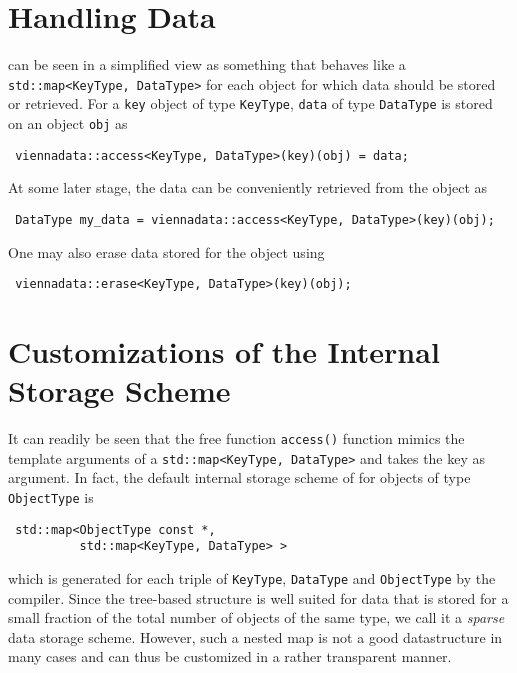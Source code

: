 \section{Handling Data}
{\ViennaData} can be seen in a simplified view as something that behaves like a \lstinline|std::map<KeyType, DataType>| for each object for which data should be stored or retrieved. For a \lstinline|key| object of type \lstinline|KeyType|, \lstinline|data| of type \lstinline|DataType| is stored on an object \lstinline|obj| as
\begin{lstlisting}
 viennadata::access<KeyType, DataType>(key)(obj) = data;
\end{lstlisting}
At some later stage, the data can be conveniently retrieved from the object as
\begin{lstlisting}
 DataType my_data = viennadata::access<KeyType, DataType>(key)(obj);
\end{lstlisting}
One may also erase data stored for the object using
\begin{lstlisting}
 viennadata::erase<KeyType, DataType>(key)(obj);
\end{lstlisting}

\section{Customizations of the Internal Storage Scheme}
It can readily be seen that the free function \lstinline|access()| function mimics the template arguments of a \lstinline|std::map<KeyType, DataType>| and takes the key as argument. In fact, the default internal storage scheme of {\ViennaData} for objects of type \lstinline|ObjectType| is 
\begin{lstlisting}
 std::map<ObjectType const *,
          std::map<KeyType, DataType> >
\end{lstlisting}
which is generated for each triple of \lstinline|KeyType|, \lstinline|DataType| and \lstinline|ObjectType| by the compiler.
Since the tree-based structure is well suited for data that is stored for a small fraction of the total number of objects of the same type, we call it a \emph{sparse} data storage scheme. However, such a nested map is not a good datastructure in many cases and can thus be customized in a rather transparent manner.

